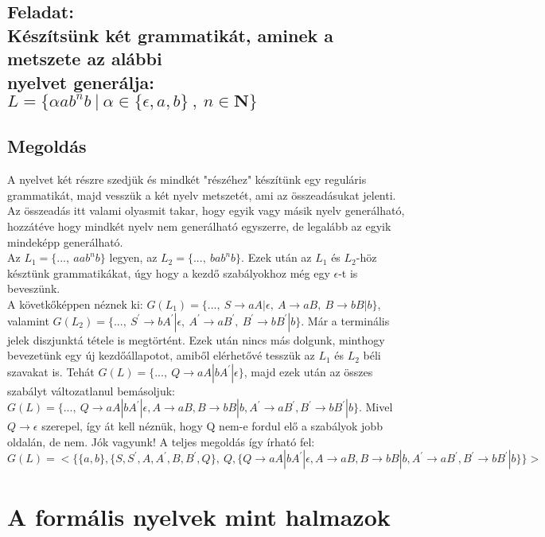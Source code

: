 \documentclass[12pt]{article}
\begin{document}
\subsection{Feladat: \\
Készítsünk két grammatikát, aminek a metszete az alábbi \\ nyelvet generálja:
$ L=\{ \alpha ab^{n}b \ |\ \alpha \in \{ \epsilon, a, b \} \ , \ n \in \mathbf{N} \} $}
\maketitle
\subsection{Megoldás}
A nyelvet két részre szedjük és mindkét "részéhez" készítünk egy reguláris grammatikát, majd vesszük a két
nyelv metszetét, ami az összeadásukat jelenti. Az összeadás itt valami olyasmit takar, hogy egyik vagy
másik nyelv generálható, hozzátéve hogy mindkét nyelv nem generálható egyszerre, de legalább az egyik
mindeképp generálható. \\
Az $L_{1}=\{ ..., \ aab^{n}b \}$ legyen, az $L_{2}=\{ ..., \ bab^{n}b \}$. Ezek után az $L_{1}$ és $L_{2}$-höz
késztünk grammatikákat, úgy hogy a kezdő szabályokhoz még egy $\epsilon$-t is beveszünk. \\
A követkőképpen néznek ki:
$G(L_{1})=\{ ..., \ S \rightarrow aA|\epsilon,\ A \rightarrow aB,\ B \rightarrow bB|b \}$, valamint
$G(L_{2})=\{ ..., \ S^{'} \rightarrow bA^{'}|\epsilon,\ A^{'} \rightarrow aB^{'},\ B^{'} \rightarrow bB^{'}|b \}$.
Már a terminális jelek diszjunktá tétele is megtörtént.
Ezek után nincs más dolgunk, minthogy bevezetünk egy új kezdőállapotot, amiből elérhetővé tesszük az
$L_{1}$ és $L_{2}$ béli szavakat is. Tehát $G(L)=\{..., \ Q \rightarrow aA|bA^{'}|\epsilon \}$, majd ezek után
az összes szabályt változatlanul bemásoljuk:
$G(L)=\{..., \ Q \rightarrow aA|bA^{'}|\epsilon, A \rightarrow aB, B \rightarrow bB|b, A^{'} \rightarrow aB^{'},
B^{'} \rightarrow bB^{'}|b \}$. Mivel $Q \rightarrow \epsilon$ szerepel, így át kell néznük, hogy Q nem-e fordul
elő a szabályok jobb oldalán, de nem. Jók vagyunk! A teljes megoldás így írható fel:
$$ G(L)=<\{ \{ a,b \}, \{ S,S^{'},A,A^{'},B,B^{'},Q \}, \ Q, \{ Q \rightarrow aA|bA^{'}|\epsilon, A \rightarrow 
aB, B \rightarrow bB|b, A^{'} \rightarrow aB^{'}, B^{'} \rightarrow bB^{'}|b \}\}> $$

\section{A formális nyelvek mint halmazok}
\end{document}
